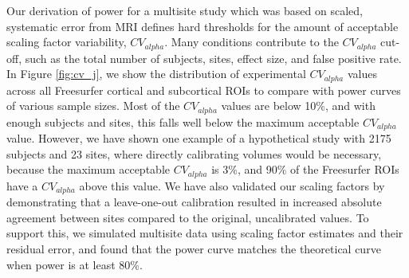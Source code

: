 Our derivation of power for a multisite study which was based on scaled, systematic error from MRI defines hard thresholds for the amount of acceptable scaling factor variability, $CV_{alpha}$. Many conditions contribute to the $CV_{alpha}$ cut-off, such as the total number of subjects, sites, effect size, and false positive rate. In Figure \ref{fig:cv_j}, we show the distribution of experimental $CV_{alpha}$ values across all Freesurfer cortical and subcortical ROIs to compare with power curves of various sample sizes. Most of the $CV_{alpha}$ values are below 10\%, and with enough subjects and sites, this falls well below the maximum acceptable $CV_{alpha}$ value. However, we have shown one example of a hypothetical study with 2175 subjects and 23 sites, where directly calibrating volumes would be necessary, because the maximum acceptable $CV_{alpha}$ is 3\%, and 90\% of the Freesurfer ROIs have a $CV_{alpha}$ above this value. We have also validated our scaling factors by demonstrating that a leave-one-out calibration resulted in increased absolute agreement between sites compared to the original, uncalibrated values. To support this, we simulated multisite data using scaling factor estimates and their residual error, and found that the power curve matches the theoretical curve when power is at least 80\%.